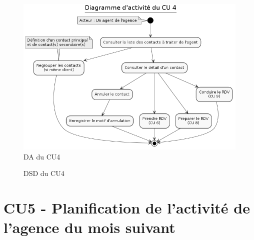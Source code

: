 \begin{figure}[H]
\centering
\includegraphics[width=\textwidth]{figures/DA_CU4.png}
\caption{DA du CU4}
\end{figure}

\begin{figure}[H]
\noindent{}
\caption{DSD du CU4}
\end{figure}



\clearpage
\section{CU5 - Planification de l’activité de l’agence du mois suivant}

